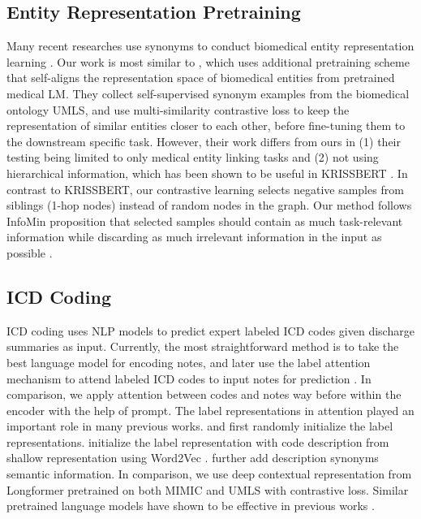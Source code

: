 \documentclass[11pt]{article}
\begin{document}
\subsection{Entity Representation Pretraining}
Many recent researches use synonyms to conduct biomedical entity representation learning \citep{sung-etal-2020-biomedical, liu-etal-2021-self, lai-etal-2021-bert-might, angell-etal-2021-clustering, Zhang2021KnowledgeRichSF, kong-etal-2021-zero, seneviratne-etal-2022-networks}. 
Our work is most similar to \citet{liu-etal-2021-self}, which uses additional pretraining scheme that self-aligns the representation space of biomedical entities from pretrained medical LM. They collect self-supervised synonym examples from the biomedical ontology UMLS, and use multi-similarity contrastive loss to keep the representation of similar entities closer to each other, before fine-tuning them to the downstream specific task.
However, their work differs from ours in (1) their testing being limited to only medical entity linking tasks and (2) not using hierarchical information, which has been shown to be useful in KRISSBERT \citep{Zhang2021KnowledgeRichSF}. In contrast to KRISSBERT, our contrastive learning selects negative samples from siblings (1-hop nodes) instead of random nodes in the graph. Our method follows InfoMin proposition that selected samples should contain as much task-relevant information while discarding as much irrelevant information in the input as possible \citep{Tian2020WhatMF}.



\subsection{ICD Coding}
ICD coding uses NLP models to predict expert labeled ICD codes given discharge summaries as input.
Currently, the most straightforward method is to take the best language model for encoding notes, and later use the label attention mechanism to attend labeled ICD codes to input notes for prediction \citep{Mullenbach2018ExplainablePO}. In comparison, we apply attention between codes and notes way before within the encoder with the help of prompt.
The label representations in attention played an important role in many previous works.
\citet{Li2020ICDCF} and \citet{Vu2020ALA} first randomly initialize the label representations. \citet{Chen2019AutomaticIC, Dong2021ExplainableAC, zhou-etal-2021-automatic} initialize the label representation with code description from shallow representation using Word2Vec  \citep{Mikolov2013EfficientEO}. \citet{Yuan2022CodeSD} further add description synonyms semantic information. 
In comparison, we use deep contextual representation from Longformer pretrained on both MIMIC and UMLS with contrastive loss. Similar pretrained language models have shown to be effective in previous works \citep{Wu2020CLEARCL, huang-etal-2022-plm, DeYoung2022EntityAI, Michalopoulos2022ICDBigBirdAC}. 
\end{document}
